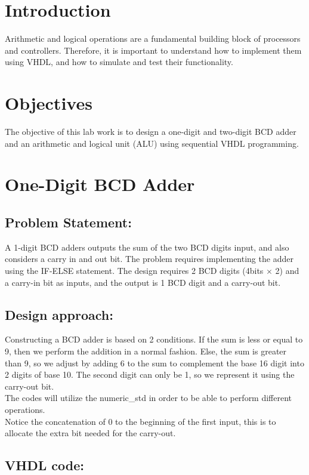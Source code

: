 \documentclass[a4paper, 12pt, english]{article}
\begin{document}
\newpage
\section*{Introduction}
Arithmetic and logical operations are a fundamental building block of processors and controllers. Therefore, it is important to understand how to implement them using VHDL, and how to simulate and test their functionality. 

\section*{Objectives}
The objective of this lab work is to design a one-digit and two-digit BCD adder and an arithmetic and logical unit (ALU) using sequential VHDL programming.

\newpage

\section{One-Digit BCD Adder}
%
\subsection{Problem Statement:}
A 1-digit BCD adders outputs the sum of the two BCD digits input, and also considers a carry in and out bit. The problem requires implementing the adder using the IF-ELSE statement.
The design requires 2 BCD digits (4bits $\times$ 2) and a carry-in bit as inputs, and the output is 1 BCD digit and a carry-out bit.
\subsection{Design approach:}
Constructing a BCD adder is based on 2 conditions. If the sum is less or equal to 9, then we perform the addition in a normal fashion. Else, the sum is greater than 9, so we adjust by adding 6 to the sum to complement the base 16 digit into 2 digits of base 10. The second digit can only be 1, so we represent it using the carry-out bit.\\
The codes will utilize the numeric\_std in order to be able to perform different operations.\\
Notice the concatenation of 0 to the beginning of the first input, this is to allocate the extra bit needed for the carry-out.
\subsection{VHDL code:}
%
\begin{listing}[H]
\inputminted[linenos,bgcolor=gray!20]{Vhdl}{part1.vhd}
\end{listing}
\end{document}
